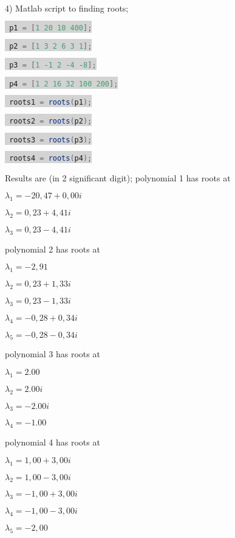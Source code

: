 \documentclass[11pt]{article}
\begin{document}
4)
Matlab script to finding roots;




\newcommand{\inlinecode}[2]{\colorbox{lightgray}{\lstinline[language=#1]$#2$}}

\inlinecode{java}{
p1 = [1 20 10 400];}

\inlinecode{java}{
p2 = [1 3 2 6 3 1];}

\inlinecode{java}{
p3 = [1 -1 2 -4 -8];}

\inlinecode{java}{
p4 = [1 2 16 32 100 200];}

\inlinecode{java}{
roots1 = roots(p1);}

\inlinecode{java}{
roots2 = roots(p2);}

\inlinecode{java}{
roots3 = roots(p3);}

\inlinecode{java}{
roots4 = roots(p4);}
\vspace{5mm} %

Results are (in 2 significant digit);
polynomial 1 has roots at 

$\lambda_1= -20,47 + 0,00i$

$\lambda_2= 0,23 + 4,41i$

$\lambda_3= 0,23 - 4,41i$

\vspace{5mm}

polynomial 2 has roots at

$\lambda_1=-2,91$

$\lambda_2=0,23 + 1,33i$

$\lambda_3=0,23 - 1,33i$

$\lambda_4=-0,28 + 0,34i$

$\lambda_5=-0,28 - 0,34i$

\vspace{5mm}

polynomial 3 has roots at

$\lambda_1=2.00$

$\lambda_2=2.00i$

$\lambda_3=-2.00i$

$\lambda_4=-1.00$

\vspace{5mm}

polynomial 4 has roots at

$\lambda_1=1,00 + 3,00i$

$\lambda_2=1,00 - 3,00i$

$\lambda_3=-1,00 + 3,00i$

$\lambda_4=-1,00 - 3,00i$

$\lambda_5=-2,00$
\end{document}
